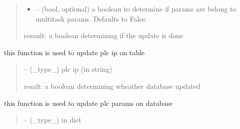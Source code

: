 \documentclass[letterpaper,10pt,english]{sphinxmanual}
\begin{document}
\begin{savenotes}
\begin{fulllineitems}
\begin{savenotes}
\begin{fulllineitems}
\begin{quote}
\begin{description}
\begin{itemize}
\item {} 
\sphinxAtStartPar
{} – (bool, optional) a boolean to determine if params are belong to multitask params. Defaults to False.

\end{itemize}

\sphinxAtStartPar
resault: a boolean determining if the update is done

\end{description}\end{quote}

\end{fulllineitems}\end{savenotes}


\begin{savenotes}\begin{fulllineitems}
\label{\detokenize{setting/database_utils:oxin.database_utils.dataBaseUtils.update_plc_ip}}
\pysigstartsignatures
{}
\pysigstopsignatures
\sphinxAtStartPar
this function is used to update plc ip on table
\begin{quote}\begin{description}
\sphinxAtStartPar
{} – (\_type\_) plc ip (in string)

\sphinxAtStartPar
resalt: a boolean determining wheather database updated

\end{description}\end{quote}

\end{fulllineitems}\end{savenotes}


\begin{savenotes}\begin{fulllineitems}
\label{\detokenize{setting/database_utils:oxin.database_utils.dataBaseUtils.update_plc_parms}}
\pysigstartsignatures
{}
\pysigstopsignatures
\sphinxAtStartPar
this function is used to update plc params on database
\begin{quote}\begin{description}
\sphinxAtStartPar
{} – (\_type\_) in dict


\end{description}
\end{quote}
\end{fulllineitems}
\end{savenotes}
\end{fulllineitems}
\end{savenotes}
\end{document}

